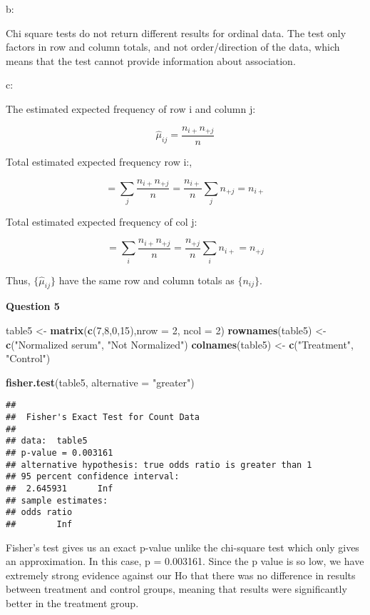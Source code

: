 \documentclass[
]{article}
\newenvironment{Shaded}{\begin{snugshade}}{\end{snugshade}}
\newcommand{\DataTypeTok}[1]{\textcolor[rgb]{0.13,0.29,0.53}{#1}}
\newcommand{\DecValTok}[1]{\textcolor[rgb]{0.00,0.00,0.81}{#1}}
\newcommand{\KeywordTok}[1]{\textcolor[rgb]{0.13,0.29,0.53}{\textbf{#1}}}
\newcommand{\NormalTok}[1]{#1}
\newcommand{\StringTok}[1]{\textcolor[rgb]{0.31,0.60,0.02}{#1}}
\begin{document}
b:

Chi square tests do not return different results for ordinal data. The
test only factors in row and column totals, and not order/direction of
the data, which means that the test cannot provide information about
association.

c:

The estimated expected frequency of row i and column j:

\[{\hat{\mu}}_{ij} = \frac{n_{i+}n_{+j}}{n}\]

Total estimated expected frequency row i:,

\[=\sum_{j}\frac{n_{i+}n_{+j}}{n} = \frac{n_{i+}}{n}\sum_{j} n_{+j} = n_{i+}\]

Total estimated expected frequency of col j:

\[=\sum_{i}\frac{n_{i+}n_{+j}}{n} = \frac{n_{+j}}{n}\sum_{i} n_{i+} = n_{+j}\]

Thus, \(\{{\hat{\mu}}_{ij}\}\) have the same row and column totals as
\(\{n_{ij}\}\).

\textbf{Question 5}

\begin{Shaded}
\begin{Highlighting}[]
\NormalTok{table5 <-}\StringTok{ }\KeywordTok{matrix}\NormalTok{(}\KeywordTok{c}\NormalTok{(}\DecValTok{7}\NormalTok{,}\DecValTok{8}\NormalTok{,}\DecValTok{0}\NormalTok{,}\DecValTok{15}\NormalTok{),}\DataTypeTok{nrow =} \DecValTok{2}\NormalTok{, }\DataTypeTok{ncol =} \DecValTok{2}\NormalTok{)}
\KeywordTok{rownames}\NormalTok{(table5) <-}\StringTok{ }\KeywordTok{c}\NormalTok{(}\StringTok{"Normalized serum"}\NormalTok{, }\StringTok{"Not Normalized"}\NormalTok{)}
\KeywordTok{colnames}\NormalTok{(table5) <-}\StringTok{ }\KeywordTok{c}\NormalTok{(}\StringTok{"Treatment"}\NormalTok{, }\StringTok{"Control"}\NormalTok{)}

\KeywordTok{fisher.test}\NormalTok{(table5, }\DataTypeTok{alternative =} \StringTok{"greater"}\NormalTok{)}
\end{Highlighting}
\end{Shaded}

\begin{verbatim}
## 
##  Fisher's Exact Test for Count Data
## 
## data:  table5
## p-value = 0.003161
## alternative hypothesis: true odds ratio is greater than 1
## 95 percent confidence interval:
##  2.645931      Inf
## sample estimates:
## odds ratio 
##        Inf
\end{verbatim}

Fisher's test gives us an exact p-value unlike the chi-square test which
only gives an approximation. In this case, p = 0.003161. Since the p
value is so low, we have extremely strong evidence against our Ho that
there was no difference in results between treatment and control groups,
meaning that results were significantly better in the treatment group.
\end{document}
